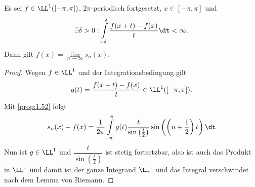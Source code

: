 \begin{prop}
\label{prop:1.53}
Es sei $f\in\LL^1([-\pi,\pi])$, $2\pi$-periodisch fortgesetzt, $x\in[-\pi,\pi]$
und
\begin{align*}
\exists \delta > 0 : \int\limits_{-\delta}^\delta \frac{f(x+t)-f(x)}{t}\dt <
\infty.
\end{align*}
Dann gilt $f(x) = \lim\limits_{n\to\infty} s_n(x)$.\fishhere
\end{prop}
\begin{proof}
Wegen $f\in\LL^1$ und der Integrationsbedingung gilt
\begin{align*}
g(t) = \frac{f(x+t)-f(x)}{t} \in \LL^1([-\pi,\pi]).
\end{align*}
Mit \ref{prop:1.52} folgt
\begin{align*}
s_n(x)-f(x) = \frac{1}{2\pi}\int\limits_{-\pi}^\pi
g(t)\frac{t}{\sin\left(\frac{t}{2}\right)}\sin\left(\left(n+\frac{1}{2}\right)t\right)\dt
\end{align*}
Nun ist $g\in\LL^1$ und $\dfrac{t}{\sin\left(\frac{t}{2}\right)}$ ist stetig
fortsetzbar, also ist auch das Produkt in $\LL^1$ und damit ist der ganze
Integrand $\LL^1$ und das Integral verschwindet nach dem Lemma von Riemann.\qedhere
\end{proof}

